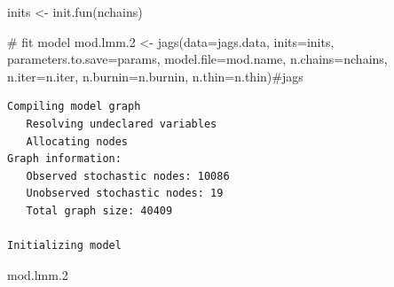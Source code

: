 \documentclass[
  13,
  letterpaper,
]{report}
\newenvironment{Shaded}{\begin{snugshade}}{\end{snugshade}}
\newcommand{\AttributeTok}[1]{\textcolor[rgb]{0.40,0.45,0.13}{#1}}
\newcommand{\CommentTok}[1]{\textcolor[rgb]{0.37,0.37,0.37}{#1}}
\newcommand{\FloatTok}[1]{\textcolor[rgb]{0.68,0.00,0.00}{#1}}
\newcommand{\FunctionTok}[1]{\textcolor[rgb]{0.28,0.35,0.67}{#1}}
\newcommand{\NormalTok}[1]{\textcolor[rgb]{0.00,0.23,0.31}{#1}}
\newcommand{\OtherTok}[1]{\textcolor[rgb]{0.00,0.23,0.31}{#1}}
\begin{document}
\begin{Shaded}
\begin{Highlighting}[]
\NormalTok{inits }\OtherTok{\textless{}{-}} \FunctionTok{init.fun}\NormalTok{(nchains)}

\CommentTok{\# fit model}
\NormalTok{mod.lmm}\FloatTok{.2} \OtherTok{\textless{}{-}} \FunctionTok{jags}\NormalTok{(}\AttributeTok{data=}\NormalTok{jags.data, }\AttributeTok{inits=}\NormalTok{inits,}
              \AttributeTok{parameters.to.save=}\NormalTok{params,}
              \AttributeTok{model.file=}\NormalTok{mod.name,}
              \AttributeTok{n.chains=}\NormalTok{nchains, }\AttributeTok{n.iter=}\NormalTok{n.iter,}
              \AttributeTok{n.burnin=}\NormalTok{n.burnin, }\AttributeTok{n.thin=}\NormalTok{n.thin)}\CommentTok{\#jags}
\end{Highlighting}
\end{Shaded}

\begin{verbatim}
Compiling model graph
   Resolving undeclared variables
   Allocating nodes
Graph information:
   Observed stochastic nodes: 10086
   Unobserved stochastic nodes: 19
   Total graph size: 40409

Initializing model
\end{verbatim}

\begin{Shaded}
\begin{Highlighting}[]
\NormalTok{mod.lmm}\FloatTok{.2}
\end{Highlighting}
\end{Shaded}
\end{document}
